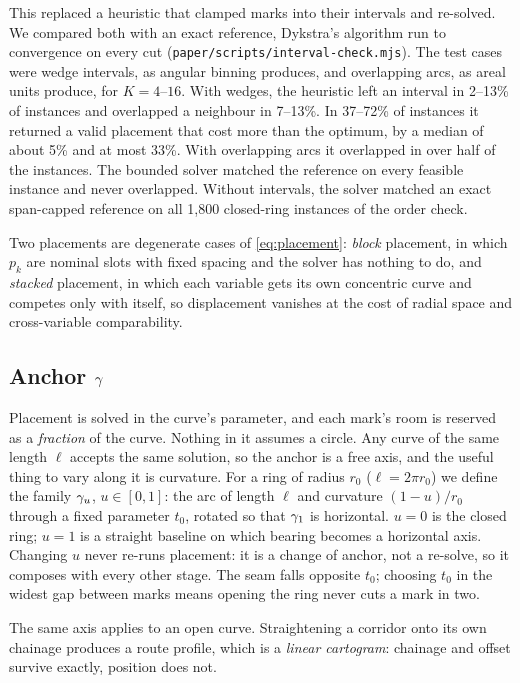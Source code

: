 This replaced a heuristic that clamped marks into their intervals and
re-solved. We compared both with an exact reference, Dykstra's algorithm run to
convergence on every cut (\texttt{paper/scripts/interval-check.mjs}). The test
cases were wedge intervals, as angular binning produces, and overlapping arcs,
as areal units produce, for $K = 4$--$16$. With wedges, the heuristic left an
interval in 2--13\% of instances and overlapped a neighbour in 7--13\%. In
37--72\% of instances it returned a valid placement that cost more than the
optimum, by a median of about 5\% and at most 33\%. With overlapping arcs it overlapped in
over half of the instances. The bounded solver matched the reference on every
feasible instance and never overlapped. Without intervals, the solver matched an
exact span-capped reference on all 1,800 closed-ring instances of the order
check.

Two placements are degenerate cases of \cref{eq:placement}: \emph{block}
placement, in which $p_k$ are nominal slots with fixed spacing and the solver
has nothing to do, and \emph{stacked} placement, in which each variable gets
its own concentric curve and competes only with itself, so displacement
vanishes at the cost of radial space and cross-variable comparability.

\subsection{Anchor $\gamma$}

Placement is solved in the curve's parameter, and each mark's room is reserved
as a \emph{fraction} of the curve. Nothing in it assumes a circle. Any curve
of the same length $\ell$ accepts the same solution, so the anchor is a free
axis, and the useful thing to vary along it is curvature. For a ring of radius
$r_0$ ($\ell = 2\pi r_0$) we define the family $\gamma_u$, $u\in[0,1]$: the arc of
length $\ell$ and curvature $(1-u)/r_0$ through a fixed parameter $t_0$,
rotated so that $\gamma_1$ is horizontal. $u=0$ is the closed ring; $u=1$ is a
straight baseline on which bearing becomes a horizontal axis. Changing $u$
never re-runs placement: it is a change of anchor, not a re-solve, so it
composes with every other stage. The seam falls opposite $t_0$; choosing $t_0$
in the widest gap between marks means opening the ring never cuts a mark in
two.

The same axis applies to an open curve. Straightening a corridor onto its own
chainage produces a route profile, which is a \emph{linear cartogram}: chainage
and offset survive exactly, position does not.

